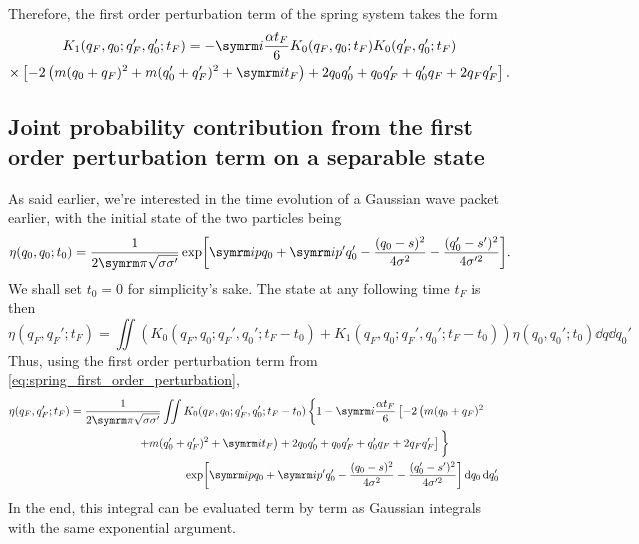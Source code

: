 Therefore, the first order perturbation term of the spring system takes the form
\begin{multline}
    K_1(q_F, q_0; q_F', q_0'; t_F) = -\im\frac{\alpha t_F}{6}K_0(q_F, q_0; t_F)K_0(q_F', q_0'; t_F) \\
    \times\left[-2\left(m(q_0 + q_F)^2 + m(q_0' + q_F')^2 + \im t_F\right) + 2q_0q_0' + q_0q_F' + q_0'q_F + 2q_Fq_F'\right]. \label{eq:spring_first_order_perturbation}
\end{multline}

\subsection{Joint probability contribution from the first order perturbation term on a separable state}

As said earlier, we're interested in the time evolution of a Gaussian wave packet earlier, with the initial state of the two particles being
\begin{equation}
    \eta(q_0, q_0; t_0) = \frac{1}{2\cpi\sqrt{\sigma\sigma'}}\exp[\im pq_0 + \im p'q_0' - \frac{(q_0 - s)^2}{4\sigma^2} - \frac{(q_0' - s')^2}{4\sigma'^2}].
\end{equation}
We shall set $t_0 = 0$ for simplicity's sake. The state at any following time $t_F$ is then
\begin{equation}
    \eta(q_F, q_F'; t_F) = \iint\left(K_0(q_F, q_0; q_F', q_0'; t_F - t_0) + K_1(q_F, q_0; q_F', q_0'; t_F - t_0)\right)\eta(q_0, q_0'; t_0)\dd{q}\dd{q_0'}
\end{equation}
Thus, using the first order perturbation term from \cref{eq:spring_first_order_perturbation},
\begin{align}
    \eta(q_F, q_F'; t_F) &= \begin{multlined}[t]
        \frac{1}{2\cpi\sqrt{\sigma\sigma'}}\iint K_0(q_F, q_0; q_F', q_0'; t_F - t_0)\left\{1 - \im\frac{\alpha t_F}{6}\left[-2\left(m(q_0 + q_F)^2 \right.\right.\right.\\
        \left.\left.\left. + m(q_0' + q_F')^2 + \im t_F\right) + 2q_0q_0' + q_0q_F' + q_0'q_F + 2q_Fq_F'\right]\vphantom{\frac{\alpha t_F}{6}}\right\}
        \\ \exp[\im pq_0 + \im p'q_0' - \frac{(q_0 - s)^2}{4\sigma^2} - \frac{(q_0' - s')^2}{4\sigma'^2}]\dd{q_0}\dd{q_0'}
    \end{multlined}
\end{align}
In the end, this integral can be evaluated term by term as Gaussian integrals with the same exponential argument.
